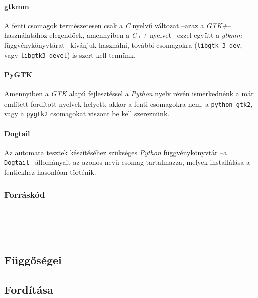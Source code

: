 \paragraph{gtkmm}

A fenti csomagok természetesen csak a \textit{C} nyelvű változat --azaz a \textit{GTK+}-- használatához elegendőek, amennyiben a \textit{C++} nyelvet --ezzel együtt a \textit{gtkmm} függvénykönyvtárat-- kívánjuk használni, további csomagokra (\texttt{libgtk-3-dev}, vagy \texttt{libgtk3-devel}) is szert kell tennünk.

\paragraph{PyGTK}

Amennyiben a \textit{GTK} alapú fejlesztéssel a \textit{Python} nyelv révén ismerkednénk a már említett fordított nyelvek helyett, akkor a fenti csomagokra nem, a \texttt{python-gtk2}, vagy a \texttt{pygtk2} csomagokat viszont be kell szereznünk.

\paragraph{Dogtail}

Az automata tesztek készítéséhez szükséges \textit{Python} függvénykönyvtár --a \texttt{Dogtail}-- állományait az azonos nevű csomag tartalmazza, melyek installálása a fentiekhez hasonlóan történik.

\subsubsection{Forráskód}


\\
\\

\\
\subsection{Függőségei}

\subsection{Fordítása}

